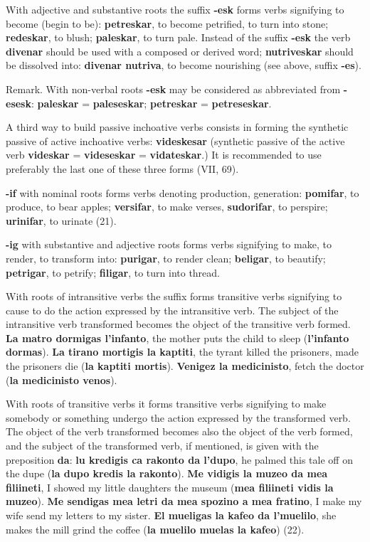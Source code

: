 With adjective and substantive roots the suffix \textbf{-esk} forms verbs signifying to become (begin to be): \textbf{petreskar}, to become petrified, to turn into stone; \textbf{redeskar}, to blush; \textbf{paleskar}, to turn pale. Instead of the suffix \textbf{-esk} the verb \textbf{divenar} should be used with a composed or derived word; \textbf{nutriveskar} should be dissolved into: \textbf{divenar nutriva}, to become nourishing (see above, suffix \textbf{-es}). 

\small Remark. With non-verbal roots \textbf{-esk} may be considered as abbreviated from \textbf{-esesk}: \textbf{paleskar} = \textbf{paleseskar}; \textbf{petreskar} = \textbf{petreseskar}. \normalsize

A third way to build passive inchoative verbs consists in forming the synthetic passive of active inchoative verbs: \textbf{videskesar} (synthetic passive of the active verb \textbf{videskar} = \textbf{videseskar} = \textbf{vidateskar}.) It is recommended to use preferably the last one of these three forms (VII, 69). 

\textbf{-if} with nominal roots forms verbs denoting production, generation: \textbf{pomifar}, to produce, to bear apples; \textbf{versifar}, to make verses, \textbf{sudorifar}, to perspire; \textbf{urinifar}, to urinate (21). 

\textbf{-ig} with substantive and adjective roots forms verbs signifying to make, to render, to transform into: \textbf{purigar}, to render clean; \textbf{beligar}, to beautify; \textbf{petrigar}, to petrify; \textbf{filigar}, to turn into thread. 

With roots of intransitive verbs the suffix forms transitive verbs signifying to cause to do the action expressed by the intransitive verb. The subject of the intransitive verb transformed becomes the object of the transitive verb formed. \textbf{La matro dormigas l’infanto}, the mother puts the child to sleep (\textbf{l'infanto dormas}). \textbf{La tirano mortigis la kaptiti}, the tyrant killed the prisoners, made the prisoners die (\textbf{la kaptiti mortis}). \textbf{Venigez la medicinisto}, fetch the doctor (\textbf{la medicinisto venos}). 

With roots of transitive verbs it forms transitive verbs signifying to make somebody or something undergo the action expressed by the transformed verb. The object of the verb transformed becomes also the object of the verb formed, and the subject of the transformed verb, if mentioned, is given with the preposition \textbf{da}: \textbf{lu kredigis ca rakonto da l'dupo}, he palmed this tale off on the dupe (\textbf{la dupo kredis la rakonto}). \textbf{Me vidigis la muzeo da mea filiineti}, I showed my little daughters the museum (\textbf{mea filiineti vidis la muzeo}). \textbf{Me sendigas mea letri da mea spozino a mea fratino}, I make my wife send my letters to my sister. \textbf{El mueligas la kafeo da l’muelilo}, she makes the mill grind the coffee (\textbf{la muelilo muelas la kafeo}) (22). 

